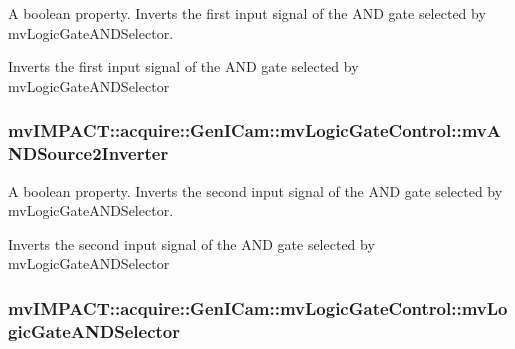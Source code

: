 A boolean property. Inverts the first input signal of the A\+N\+D gate selected by mv\+Logic\+Gate\+A\+N\+D\+Selector. 

Inverts the first input signal of the A\+N\+D gate selected by mv\+Logic\+Gate\+A\+N\+D\+Selector \hypertarget{classmv_i_m_p_a_c_t_1_1acquire_1_1_gen_i_cam_1_1mv_logic_gate_control_af34f748bfd0df08d6c5a915794a0eea2}{
\subsubsection[{mv\+A\+N\+D\+Source2\+Inverter}]{ mv\+I\+M\+P\+A\+C\+T\+::acquire\+::\+Gen\+I\+Cam\+::mv\+Logic\+Gate\+Control\+::mv\+A\+N\+D\+Source2\+Inverter}}\label{classmv_i_m_p_a_c_t_1_1acquire_1_1_gen_i_cam_1_1mv_logic_gate_control_af34f748bfd0df08d6c5a915794a0eea2}


A boolean property. Inverts the second input signal of the A\+N\+D gate selected by mv\+Logic\+Gate\+A\+N\+D\+Selector. 

Inverts the second input signal of the A\+N\+D gate selected by mv\+Logic\+Gate\+A\+N\+D\+Selector \hypertarget{classmv_i_m_p_a_c_t_1_1acquire_1_1_gen_i_cam_1_1mv_logic_gate_control_abba6d54999f450e8f08934c0af5bec0d}{
\subsubsection[{mv\+Logic\+Gate\+A\+N\+D\+Selector}]{ mv\+I\+M\+P\+A\+C\+T\+::acquire\+::\+Gen\+I\+Cam\+::mv\+Logic\+Gate\+Control\+::mv\+Logic\+Gate\+A\+N\+D\+Selector}}\label{classmv_i_m_p_a_c_t_1_1acquire_1_1_gen_i_cam_1_1mv_logic_gate_control_abba6d54999f450e8f08934c0af5bec0d}


